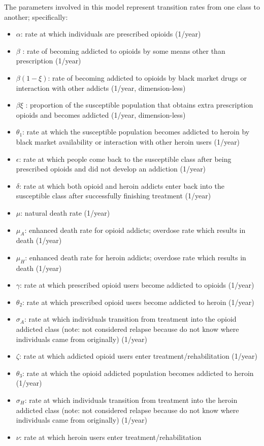 \documentclass[12pt]{article}
\begin{document}
The parameters involved in this model represent transition rates from one class to another; specifically: 
\begin{itemize}
\item $\alpha$: rate at which individuals are prescribed opioids (1/year)
\item $\beta$ : rate of becoming addicted to opioids by some means other than prescription (1/year)
\item $\beta(1-\xi)$: rate of becoming addicted to opioids by black market drugs or interaction with other addicts (1/year, dimension-less)
\item $\beta \xi$ : proportion of the susceptible population that obtains extra prescription opioids and becomes addicted  (1/year, dimension-less)
\item $\theta_1$: rate at which the susceptible population becomes addicted to heroin by black market availability or interaction with other heroin users  (1/year)
\item $\epsilon$: rate at which people come back to the susceptible class after being prescribed opioids and did not develop an addiction (1/year) 
\item $\delta$: rate at which both opioid and heroin addicts enter back into the susceptible class after successfully finishing treatment (1/year)
\item $\mu$: natural death rate (1/year)
\item $\mu_A$: enhanced death rate for opioid addicts; overdose rate which results in death (1/year)
\item $\mu_H$: enhanced death rate for heroin addicts; overdose rate which results in death (1/year)
\item $\gamma$: rate at which prescribed opioid users become addicted to opioids (1/year)
\item $\theta_2$: rate at which prescribed opioid users become addicted to heroin (1/year)
\item $\sigma_A$: rate at which individuals transition from treatment into the opioid addicted class (note: not considered relapse because do not know where individuals came from originally) (1/year)
\item $\zeta$: rate at which addicted opioid users enter treatment/rehabilitation (1/year)
\item $\theta_3$: rate at which the opioid addicted population becomes addicted to heroin  (1/year)
\item$\sigma_H$: rate at which individuals transition from treatment into the heroin addicted class (note: not considered relapse because do not know where individuals came from originally) (1/year)
\item $\nu$: rate at which heroin users enter treatment/rehabilitation 
\end{itemize}
\end{document}
